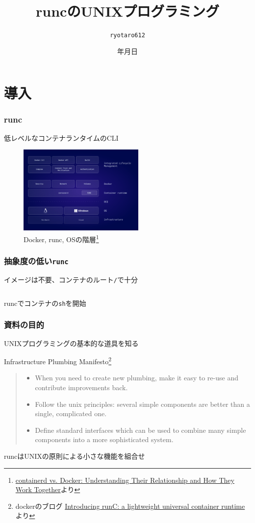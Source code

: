 \documentclass[unicode, 14pt, aspectratio=169]{beamer}
\date{\number\year 年\number\month 月\number\day 日}
\title{runcのUNIXプログラミング}
\author{\texttt{ryotaro612}}
\begin{document}
\begin{frame}
\titlepage
\end{frame}
\section{導入}
\begin{frame}[t]
  \frametitle{runc}
  \large
  低レベルなコンテナランタイムのCLI
  \normalsize
  \begin{figure}
    \centering
    \includegraphics[width=6.2cm]{images/containerd-diagram-v1.png} 
    \caption{Docker, runc, OSの階層\footnote{\scriptsize{\href{https://www.docker.com/blog/containerd-vs-docker}{containerd vs. Docker: Understanding Their Relationship and How They Work Together}より}}}
    \label{fig:runc}
  \end{figure}
\end{frame}
\begin{frame}[t]%
  \frametitle{抽象度の低い\texttt{runc}}
  \large
  イメージは不要、コンテナのルート\texttt{/}で十分
  \normalsize
  \begin{center}
    \inputminted[fontsize=\small]{sh}{code/run.sh}
    runcでコンテナの\texttt{sh}を開始
  \end{center}
\end{frame}
\begin{frame}[t]
  \frametitle{資料の目的}
  \large
  UNIXプログラミングの基本的な道具を知る
  \normalsize 
  \begin{center}
    Infrastructure Plumbing Manifesto\footnote{\scriptsize{dockerのブログ \href{https://www.docker.com/blog/runc/}{Introducing runC: a lightweight universal container runtime
}より}}
    \end{center}
  \begin{quote}
    \begin{itemize}
    \item {\small When you need to create new plumbing, make it easy to re-use and contribute improvements back.}
    \item {\small Follow the unix principles: several simple components are better than a single, complicated one.}
    \item {\small Define standard interfaces which can be used to combine many simple components into a more sophisticated system.}
  \end{itemize}
\end{quote}
  runcはUNIXの原則による小さな機能を組合せ
\end{frame}
\end{document}
